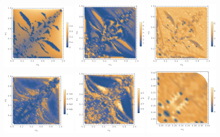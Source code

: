 \documentclass[%
reprint,
superscriptaddress,
amsmath,amssymb,
aps,
prd,
floatfix,
nofootinbib
]{revtex4-1}
\begin{document}
\begin{figure}
  \centering
  \includegraphics[width=0.32\textwidth]{plot/energy-ratio-sine-2d.png}
  \includegraphics[width=0.32\textwidth]{plot/r_max-sine-2d.png}
  \includegraphics[width=0.32\textwidth]{plot/slow-mode-logscale-sine-2d.png} \\\vskip-5pt
  \includegraphics[width=0.32\textwidth]{plot/energy-ratio-sine-3d.png}
  \includegraphics[width=0.32\textwidth]{plot/r_max-sine-3d.png}
  \includegraphics[width=0.32\textwidth]{plot/slow-mode-logscale-sine-3d.png}

\end{figure}
\end{document}
